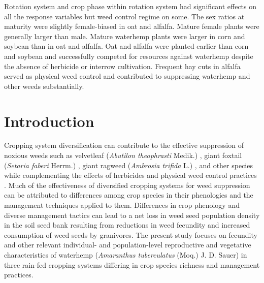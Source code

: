 \documentclass[utf8]{frontiersSCNS}
\begin{document}
Rotation system and crop phase within rotation system had significant effects on all the response variables but weed control regime on some. The sex ratios at maturity were slightly female-biased in oat and alfalfa. Mature female plants were generally larger than male. Mature waterhemp plants were larger in corn and soybean than in oat and alfalfa. Oat and alfalfa were planted earlier than corn and soybean and successfully competed for resources against waterhemp despite the absence of herbicide or interrow cultivation. Frequent hay cuts in alfalfa served as physical weed control and contributed to suppressing waterhemp and other weeds substantially.

\hypertarget{introduction}{%
\section*{Introduction}\label{introduction}}

Cropping system diversification can contribute to the effective suppression of noxious weeds such as velvetleaf (\emph{Abutilon theophrasti} Medik.) \citep{westermanAreManyLittle2005}, giant foxtail (\emph{Setaria faberi} Herrm.) \citep{liebmanFatesSetariaFaberi2014}, giant ragweed (\emph{Ambrosia trifida} L.) \citep{liebmanCroppingSystemRedesign2020}, and other species while complementing the effects of herbicides and physical weed control practices \citep{davisIncreasingCroppingSystem2012, weisbergerDoesDiversifyingCrop2019}.
Much of the effectiveness of diversified cropping systems for weed suppression can be attributed to differences among crop species in their phenologies and the management techniques applied to them. Differences in crop phenology and diverse management tactics can lead to a net loss in weed seed population density in the soil seed bank \citep{maclarenEcologicalFutureWeed2020, liebmanManyLittleHammers1997} resulting from reductions in weed fecundity and increased consumption of weed seeds by granivores. The present study focuses on fecundity and other relevant individual- and population-level reproductive and vegetative characteristics of waterhemp (\emph{Amaranthus tuberculatus} (Moq.) J. D. Sauer) in three rain-fed cropping systems differing in crop species richness and management practices.
\end{document}
